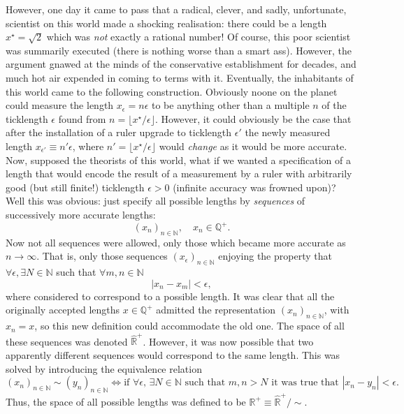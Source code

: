 \documentclass[11pt]{amsart}
\theoremstyle{plain}%
\theoremstyle{definition}
\theoremstyle{remark}
\begin{document}
However, one day it came to pass that a radical, clever, and sadly, unfortunate, scientist on this world made a shocking realisation: there could be a length $x^\star = \sqrt{2}$ which was \emph{not} exactly a rational number! Of course, this poor scientist was summarily executed (there is nothing worse than a smart ass). However, the argument gnawed at the minds of the conservative establishment for decades, and much hot air expended in coming to terms with it. Eventually, the inhabitants of this world came to the following construction. Obviously noone on the planet could measure the length $x_{\epsilon} = n\epsilon$ to be anything other than a multiple $n$ of the ticklength $\epsilon$ found from $n = \lfloor x^\star/\epsilon \rfloor$. However, it could obviously be the case that after the installation of a ruler upgrade to ticklength $\epsilon'$ the newly measured length $x_{\epsilon'} \equiv n'\epsilon$, where $n' = \lfloor x^\star/\epsilon \rfloor$ would \emph{change} as it would be more accurate. Now, supposed the theorists of this world, what if we wanted a specification of a length that would encode the result of a measurement by a ruler with arbitrarily good (but still finite!) ticklength  $\epsilon > 0$ (infinite accuracy was frowned upon)? Well this was obvious: just specify all possible lengths by \emph{sequences} of successively more accurate lengths:
\begin{equation}
	(x_n)_{n \in \mathbb{N}}, \quad x_n\in \mathbb{Q}^+.
\end{equation}
Now not all sequences were allowed, only those which became more accurate as $n \rightarrow \infty$. That is, only those sequences $(x_\epsilon)_{n \in \mathbb{N}}$ enjoying the property that $\forall \epsilon, \exists N\in \mathbb{N}$ such that $\forall m,n\in \mathbb{N}$
\begin{equation}
	|x_n-x_m| < \epsilon,
\end{equation} 
where considered to correspond to a possible length. It was clear that all the originally accepted lengths $x\in \mathbb{Q}^+$ admitted the representation $(x_n)_{n\in \mathbb{N}}$, with $x_n = x$, so this new definition could accommodate the old one. The space of all these sequences was denoted $\widehat{\mathbb{R}}^+$. However, it was now possible that two apparently different sequences would correspond to the same length. This was solved by introducing the equivalence relation 
\begin{equation}
	(x_n)_{n \in \mathbb{N}} \sim (y_n)_{n \in \mathbb{N}} \Leftrightarrow \text{if $\forall \epsilon$, $\exists N\in \mathbb{N}$ such that $m,n>N$ it was true that $|x_n-y_n| < \epsilon$.} 
\end{equation}
Thus, the space of all possible lengths was defined to be $\mathbb{R}^+ \equiv \widehat{\mathbb{R}}^+/\sim$.
\end{document}
